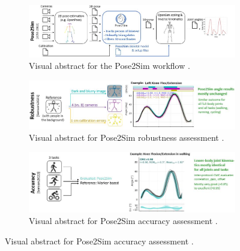 \begin{figure}[hbtp]
	\centering
	\begin{subfigure}[b]{1\textwidth}
            \centering
            \def\svgwidth{1\columnwidth}
            \fontsize{10pt}{10pt}\selectfont
            \includegraphics[width=\linewidth]{"../Intro/Figures/Fig_VisAbstract1.JPG"}
            \caption{Visual abstract for the Pose2Sim workflow \cite{Pagnon2022b}.}
            \label{fig_visabstract1_1}
	\end{subfigure}
	\vskip 1cm
	\begin{subfigure}[b]{1\textwidth}
            \centering
            \def\svgwidth{1\columnwidth}
            \fontsize{10pt}{10pt}\selectfont
            \includegraphics[width=\linewidth]{"../Intro/Figures/Fig_VisAbstract2.JPG"}
            \caption{Visual abstract for Pose2Sim robustness assessment \cite{Pagnon2021}.}
            \label{fig_visabstract2_1}
	\end{subfigure}
	\vskip 1cm
      \begin{subfigure}[b]{1\textwidth}
            \centering
            \def\svgwidth{1\columnwidth}
            \fontsize{10pt}{10pt}\selectfont
            \includegraphics[width=\linewidth]{"../Intro/Figures/Fig_VisAbstract3.JPG"}
            \caption{Visual abstract for Pose2Sim accuracy assessment \cite{Pagnon2022a}.}
            \label{fig_visabstract3_1}
	\end{subfigure}

\end{figure}
